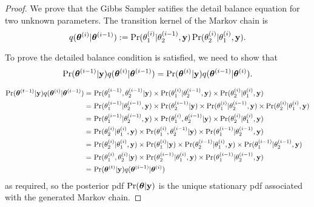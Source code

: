 \begin{proof}
    We prove that the Gibbs Sampler satifies the detail balance
    equation for two unknown parameters.
    The transition kernel of the Markov chain is
    $$
        q(\bm{\theta}^{(i)}|\bm{\theta}^{(i-1)})
        := \Pr(\theta^{(i)}_1 | \theta^{(i-1)}_2, \mathbf{y})
        \Pr(\theta^{(i)}_2 | \theta^{(i)}_1, \mathbf{y}).
    $$

    To prove the detailed balance condition is satisfied, we need to show that
    $$
        \Pr(\bm{\theta}^{(i-1)}| \mathbf{y})q(\bm{\theta}^{(i)}|\bm{\theta}^{(i-1)})
        = \Pr(\bm{\theta}^{(i)}| \mathbf{y})q(\bm{\theta}^{(i - 1)}|\bm{\theta}^{(i)}).
    $$

    \begin{align*}
        \Pr(\bm{\theta}^{(t-1)}| \mathbf{y})q(\bm{\theta}^{(i)}|\bm{\theta}^{(i-1)})
        = & \, \Pr(\theta_1^{(i-1)}, \theta_2^{(i-1)}| \mathbf{y}) \times
        \Pr(\theta^{(i)}_1 | \theta^{(i-1)}_2, \mathbf{y}) \times
        \Pr(\theta^{(i)}_2 | \theta^{(i)}_1, \mathbf{y})                        \\
        = & \, \Pr(\theta_1^{(i-1)}| \theta_2^{(i-1)}, \mathbf{y}) \times
        \Pr(\theta_2^{(i-1)}| \mathbf{y}) \times
        \Pr(\theta^{(i)}_1 | \theta^{(i-1)}_2, \mathbf{y}) \times
        \Pr(\theta^{(i)}_2 | \theta^{(i)}_1, \mathbf{y})                        \\
        = & \, \Pr(\theta_1^{(i-1)}| \theta_2^{(i-1)}, \mathbf{y}) \times
        \Pr(\theta^{(i)}_1, \theta^{(i-1)}_2 | \mathbf{y}) \times
        \Pr(\theta^{(i)}_2 | \theta^{(i)}_1, \mathbf{y})                        \\
        = & \, \Pr(\theta^{(i)}_2 | \theta^{(i)}_1, \mathbf{y}) \times
        \Pr(\theta^{(i)}_1, \theta^{(i-1)}_2 | \mathbf{y}) \times
        \Pr(\theta_1^{(i-1)}| \theta_2^{(i-1)}, \mathbf{y})                     \\
        = & \, \Pr(\theta^{(i)}_2 | \theta^{(i)}_1, \mathbf{y}) \times
        \Pr(\theta^{(i)}_1 | \mathbf{y})  \times
        \Pr(\theta^{(i-1)}_2 | \theta^{(i)}_1, \mathbf{y}) \times
        \Pr(\theta_1^{(i-1)}| \theta_2^{(i-1)}, \mathbf{y})                     \\
        = & \, \Pr(\theta^{(i)}_1, \theta^{(i)}_2| \mathbf{y}) \times
        \Pr(\theta^{(i-1)}_2 | \theta^{(i)}_1, \mathbf{y}) \times
        \Pr(\theta_1^{(i-1)}| \theta_2^{(i-1)}, \mathbf{y})                     \\
        = & \, \Pr(\bm{\theta}^{(t)}| \mathbf{y}) q(\bm{\theta}^{(i -1)}|\bm{\theta}^{(i)})
    \end{align*}
    as required, so the posterior pdf $\Pr(\bm{\theta}|\mathbf{y})$ is the unique
    stationary pdf associated with the generated Markov chain.
\end{proof}

